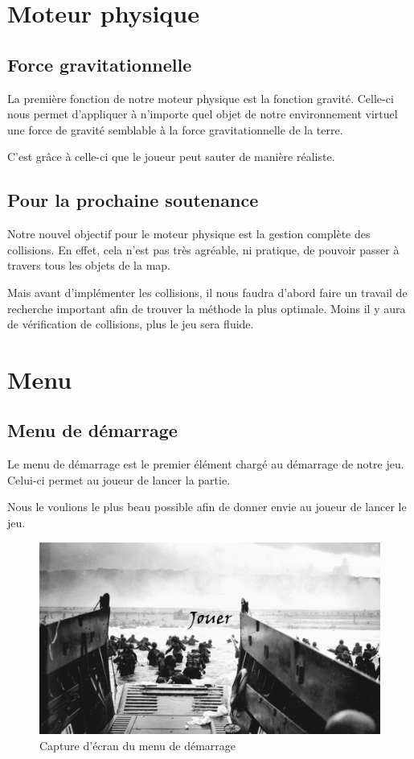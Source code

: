 \documentclass[11pt]{report}
\begin{document}
\newpage
\section{Moteur physique}

\subsection{Force gravitationnelle}

La première fonction de notre moteur physique est la fonction gravité. Celle-ci nous permet d'appliquer à n'importe quel objet de notre environnement virtuel une force de gravité semblable à la force gravitationnelle de la terre.

C'est grâce à celle-ci que le joueur peut sauter de manière réaliste.

\subsection{Pour la prochaine soutenance}

Notre nouvel objectif pour le moteur physique est la gestion complète des collisions. En effet, cela n'est pas très agréable, ni pratique, de pouvoir passer à travers tous les objets de la map.

Mais avant d'implémenter les collisions, il nous faudra d'abord faire un travail de recherche important afin de trouver la méthode la plus optimale. Moins il y aura de vérification de collisions, plus le jeu sera fluide. 

\newpage
\section{Menu}

\subsection{Menu de démarrage}

Le menu de démarrage est le premier élément chargé au démarrage de notre jeu. Celui-ci permet au joueur de lancer la partie.

Nous le voulions le plus beau possible afin de donner envie au joueur de lancer le jeu.

\begin{figure}[htbp]
\centering
\includegraphics[scale=0.13]{menu-start.png}
\caption{Capture d'écran du menu de démarrage}
\end{figure}
\end{document}
